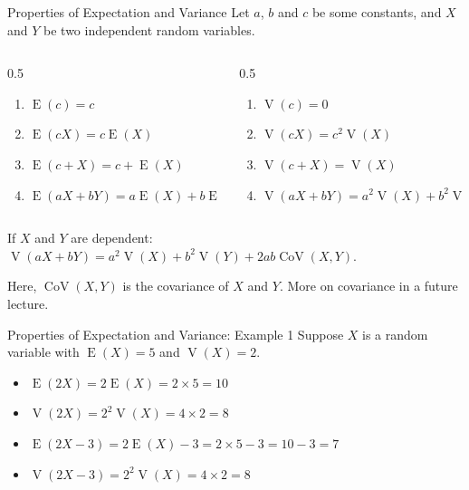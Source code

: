 \documentclass[12pt, aspectratio=169]{beamer}
\DeclareMathOperator{\E}{E}
\DeclareMathOperator{\V}{V}
\begin{document}
	\begin{frame}{Properties of Expectation and Variance}
		Let $a$, $b$ and $c$ be some constants, and $X$ and $Y$ be two independent random variables.
		\begin{columns}
			\begin{column}{0.5\textwidth}
				\begin{enumerate}
					\item \(\E(c) = c\)
					\item \(\E(cX) = c \E(X)\)
					\item \(\E(c + X) = c + \E(X)\)
					\item \(\E(aX + bY) = a \E(X) + b \E(Y)\)
				\end{enumerate}
			\end{column}
			
			\begin{column}{0.5\textwidth}
				\begin{enumerate}
					\item \(\V(c) = 0\)
					\item \(\V(cX) = c^2 \V(X)\)
					\item \(\V(c + X) = \V(X)\)
					\item \(\V(aX + bY) = a^2 \V(X) + b^2 \V(Y)\)
				\end{enumerate}
			\end{column}
		\end{columns}
		
		\vspace{1em}

		If $X$ and $Y$ are dependent: \(\V(aX + bY) = a^2 \V(X) + b^2 \V(Y) + 2ab \operatorname{CoV}(X,Y)\).

		\vspace{0.5em}
		
		Here, $\operatorname{CoV}(X,Y)$ is the covariance of $X$ and $Y$. More on covariance in a future lecture.
	\end{frame}


	\begin{frame}{Properties of Expectation and Variance: Example 1}
		Suppose $X$ is a random variable with \(\E(X) = 5\) and \(\V(X)=2\).

		\begin{itemize}
			\item \(\E(2X) = 2 \E(X) = 2 \times 5 = 10\)
			\item \(\V(2X) = 2^2 \V(X) = 4 \times 2 = 8\)
			\item \(\E(2X - 3) = 2 \E(X) - 3 = 2 \times 5 - 3= 10 - 3 = 7\)
			\item \(\V(2X - 3) = 2^2 \V(X)= 4 \times 2 = 8\)
		\end{itemize}
	\end{frame}
\end{document}
